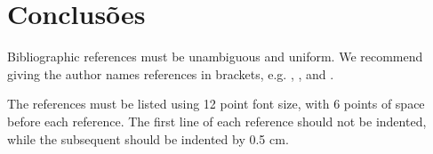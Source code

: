 \documentclass[12pt]{article}
\begin{document}
\section{Conclusões}
\label{sec:conclusao}

Bibliographic references must be unambiguous and uniform.  We recommend giving
the author names references in brackets, e.g. \cite{knuth:84},
\cite{boulic:91}, and \cite{smith:99}.

The references must be listed using 12 point font size, with 6 points of space
before each reference. The first line of each reference should not be
indented, while the subsequent should be indented by 0.5 cm.



\end{document}
